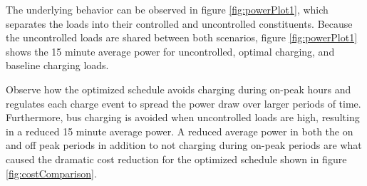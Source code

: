 	\par The underlying behavior can be observed in figure \ref{fig:powerPlot1}, which separates the loads into their controlled and uncontrolled constituents. Because the uncontrolled loads are shared between both scenarios, figure \ref{fig:powerPlot1} shows the 15 minute average power for uncontrolled, optimal charging, and baseline charging loads. 
	\par Observe how the optimized schedule avoids charging during on-peak hours and regulates each charge event to spread the power draw over larger periods of time. Furthermore, bus charging is avoided when uncontrolled loads are high, resulting in a reduced 15 minute average power.  A reduced average power in both the on and off peak periods in addition to not charging during on-peak periods are what caused the dramatic cost reduction for the optimized schedule shown in figure \ref{fig:costComparison}.

\begin{figure*}
	\centering
	\caption{15-Minute AVerage Power for one day}
	\label{fig:totalPower1}
\end{figure*} 
\begin{figure*}
	\centering
	\caption{Comparison between uncontrolled and bus loads}
	\label{fig:powerPlot1}
\end{figure*}

